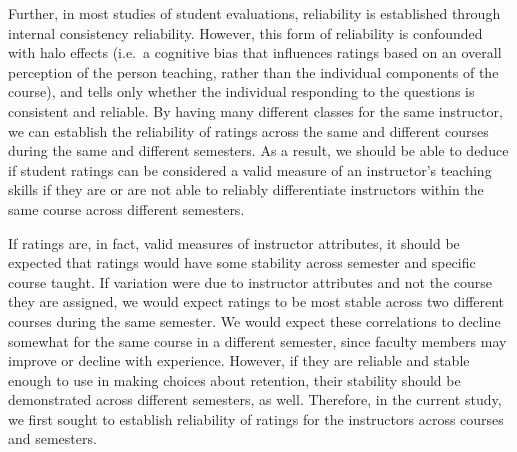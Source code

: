 \documentclass[man]{apa6}
\theoremstyle{definition}
\theoremstyle{definition}
\theoremstyle{definition}
\theoremstyle{remark}
\begin{document}
Further, in most studies of student evaluations, reliability is
established through internal consistency reliability. However, this form
of reliability is confounded with halo effects (i.e.~a cognitive bias
that influences ratings based on an overall perception of the person
teaching, rather than the individual components of the course), and
tells only whether the individual responding to the questions is
consistent and reliable. By having many different classes for the same
instructor, we can establish the reliability of ratings across the same
and different courses during the same and different semesters. As a
result, we should be able to deduce if student ratings can be considered
a valid measure of an instructor's teaching skills if they are or are
not able to reliably differentiate instructors within the same course
across different semesters.

If ratings are, in fact, valid measures of instructor attributes, it
should be expected that ratings would have some stability across
semester and specific course taught. If variation were due to instructor
attributes and not the course they are assigned, we would expect ratings
to be most stable across two different courses during the same semester.
We would expect these correlations to decline somewhat for the same
course in a different semester, since faculty members may improve or
decline with experience. However, if they are reliable and stable enough
to use in making choices about retention, their stability should be
demonstrated across different semesters, as well. Therefore, in the
current study, we first sought to establish reliability of ratings for
the instructors across courses and semesters.
\end{document}
